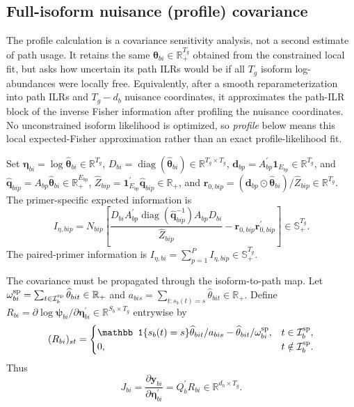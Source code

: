 \documentclass[11pt]{article}
\begin{document}
\subsection*{Full-isoform nuisance (profile) covariance}

The profile calculation is a covariance sensitivity analysis, not a second estimate of path usage. It retains the same \(\widehat{\bm\theta}_{bi}\in\mathbb R_+^{T_g}\) obtained from the constrained local fit, but asks how uncertain its path ILRs would be if all \(T_g\) isoform log-abundances were locally free. Equivalently, after a smooth reparameterization into path ILRs and \(T_g-d_b\) nuisance coordinates, it approximates the path-ILR block of the inverse Fisher information after profiling the nuisance coordinates. No unconstrained isoform likelihood is optimized, so \emph{profile} below means this local expected-Fisher approximation rather than an exact profile-likelihood fit.

Set \(\bm\eta_{bi}=\log\widehat{\bm\theta}_{bi}\in\mathbb R^{T_g}\), \(D_{bi}=\operatorname{diag}(\widehat{\bm\theta}_{bi})\in \mathbb R^{T_g\times T_g}\), \(\bm d_{bp}=A_{bp}^\prime\bm1_{E_{bp}}\in\mathbb R^{T_g}\), and \(\widehat{\bm q}_{bip}=A_{bp}\widehat{\bm\theta}_{bi} \in\mathbb R_+^{E_{bp}}\), \(\widehat Z_{bip}=\bm1_{E_{bp}}^\prime\widehat{\bm q}_{bip} \in\mathbb R_+\), and \(\bm r_{0,bip}=(\bm d_{bp}\odot\widehat{\bm\theta}_{bi})/ \widehat Z_{bip} \in\mathbb R^{T_g}\). The primer-specific expected information is \[
 I_{\eta,bip}=N_{bip}\left[
 \frac{D_{bi}A_{bp}^\prime
 \operatorname{diag}(\widehat{\bm q}_{bip}^{-1})A_{bp}D_{bi}}
 {\widehat Z_{bip}}
 -\bm r_{0,bip}\bm r_{0,bip}^\prime
 \right]\in\mathbb S_+^{T_g}.
\]
The paired-primer information is \(I_{\eta,bi}=\sum_{p=1}^P I_{\eta,bip}\in\mathbb S_+^{T_g}\).

The covariance must be propagated through the isoform-to-path map. Let \(\omega_{bi}^{\rm sp}=\sum_{t\in\mathcal I_b^{\rm sp}} \widehat\theta_{bit}\in\mathbb R_+\) and \(a_{bis}=\sum_{t:s_b(t)=s}\widehat\theta_{bit}\in\mathbb R_+\). Define \(R_{bi}=\partial\log\bm\psi_{bi}/\partial\bm\eta_{bi}^\prime \in\mathbb R^{S_b\times T_g}\) entrywise by \[
 (R_{bi})_{st}=
 \begin{cases}
  \mathbb 1\{s_b(t)=s\}\widehat\theta_{bit}/a_{bis}
  -\widehat\theta_{bit}/\omega_{bi}^{\rm sp},
  &t\in\mathcal I_b^{\rm sp},\\
  0,&t\notin\mathcal I_b^{\rm sp}.
 \end{cases}
\]
Thus \[
 J_{bi}=\frac{\partial\bm y_{bi}}
 {\partial\bm\eta_{bi}^\prime}
 =Q_b^\prime R_{bi}\in\mathbb R^{d_b\times T_g}.
\]
\end{document}
